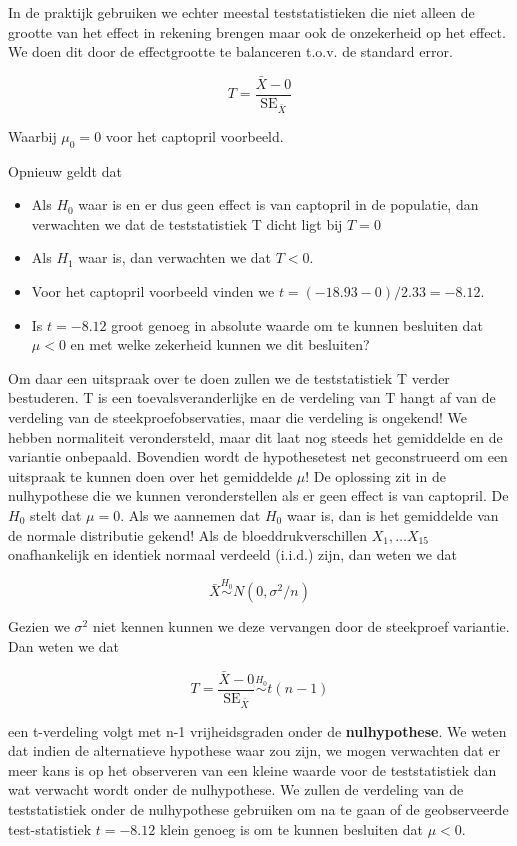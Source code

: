 \documentclass[
  dutch,
  letterpaper,
  12pt]{book}
\providecommand{\tightlist}{%
  \setlength{\itemsep}{0pt}\setlength{\parskip}{0pt}}
\theoremstyle{definition}
\theoremstyle{definition}
\theoremstyle{definition}
\theoremstyle{remark}
\begin{document}
In de praktijk gebruiken we echter meestal teststatistieken die niet
alleen de grootte van het effect in rekening brengen maar ook de
onzekerheid op het effect. We doen dit door de effectgrootte te
balanceren t.o.v. de standard error.

\[T=\frac{\bar{X}-0}{\text{SE}_{\bar X}}\]

Waarbij \(\mu_0=0\) voor het captopril voorbeeld.

Opnieuw geldt dat

\begin{itemize}
\tightlist
\item
  Als \(H_0\) waar is en er dus geen effect is van captopril in de
  populatie, dan verwachten we dat de teststatistiek T dicht ligt bij
  \(T=0\)
\item
  Als \(H_1\) waar is, dan verwachten we dat \(T<0\).
\item
  Voor het captopril voorbeeld vinden we \(t=(-18.93-0)/2.33=-8.12\).
\item
  Is \(t = -8.12\) groot genoeg in absolute waarde om te kunnen
  besluiten dat \(\mu < 0\) en met welke zekerheid kunnen we dit
  besluiten?
\end{itemize}

Om daar een uitspraak over te doen zullen we de teststatistiek T verder
bestuderen. T is een toevalsveranderlijke en de verdeling van T hangt af
van de verdeling van de steekproefobservaties, maar die verdeling is
ongekend! We hebben normaliteit verondersteld, maar dit laat nog steeds
het gemiddelde en de variantie onbepaald. Bovendien wordt de
hypothesetest net geconstrueerd om een uitspraak te kunnen doen over het
gemiddelde \(\mu\)! De oplossing zit in de nulhypothese die we kunnen
veronderstellen als er geen effect is van captopril. De \(H_0\) stelt
dat \(\mu=0\). Als we aannemen dat \(H_0\) waar is, dan is het
gemiddelde van de normale distributie gekend! Als de
bloeddrukverschillen \(X_1, \ldots X_{15}\) onafhankelijk en identiek
normaal verdeeld (i.i.d.) zijn, dan weten we dat

\[\bar X  \stackrel{H_0}{\sim} N(0, \sigma^2/n)\]

Gezien we \(\sigma^2\) niet kennen kunnen we deze vervangen door de
steekproef variantie. Dan weten we dat

\[T=\frac{\bar{X}-0}{\text{SE}_{\bar X}}\stackrel{H_0}{\sim} t(n-1) \]

een t-verdeling volgt met n-1 vrijheidsgraden onder de
\textbf{nulhypothese}. We weten dat indien de alternatieve hypothese
waar zou zijn, we mogen verwachten dat er meer kans is op het observeren
van een kleine waarde voor de teststatistiek dan wat verwacht wordt
onder de nulhypothese. We zullen de verdeling van de teststatistiek
onder de nulhypothese gebruiken om na te gaan of de geobserveerde
test-statistiek \(t = -8.12\) klein genoeg is om te kunnen besluiten dat
\(\mu < 0\).
\end{document}
